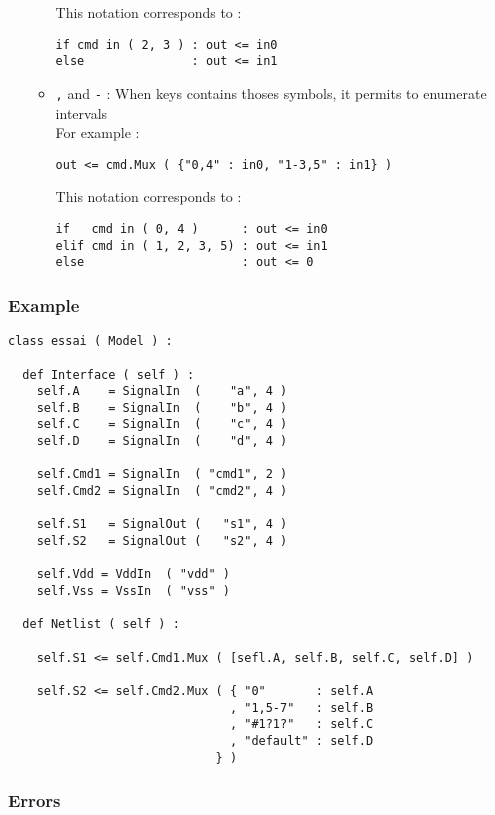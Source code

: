 \begin{itemize}
\begin{itemize}
\begin{verbatim}
        \end{verbatim}
        This notation corresponds to :
        \begin{verbatim}
if cmd in ( 2, 3 ) : out <= in0
else               : out <= in1
        \end{verbatim}
        \item \verb-,- and \verb"-" : When keys contains thoses symbols, it permits to enumerate intervals\\
        For example :
        \begin{verbatim}
out <= cmd.Mux ( {"0,4" : in0, "1-3,5" : in1} )
        \end{verbatim}
        This notation corresponds to :
        \begin{verbatim}
if   cmd in ( 0, 4 )      : out <= in0
elif cmd in ( 1, 2, 3, 5) : out <= in1
else                      : out <= 0
        \end{verbatim}
    \end{itemize}
\end{itemize}
          
\subsubsection{Example}

\begin{verbatim}
class essai ( Model ) :

  def Interface ( self ) :
    self.A    = SignalIn  (    "a", 4 )
    self.B    = SignalIn  (    "b", 4 )
    self.C    = SignalIn  (    "c", 4 )
    self.D    = SignalIn  (    "d", 4 )
    
    self.Cmd1 = SignalIn  ( "cmd1", 2 )
    self.Cmd2 = SignalIn  ( "cmd2", 4 )
    
    self.S1   = SignalOut (   "s1", 4 )
    self.S2   = SignalOut (   "s2", 4 )

    self.Vdd = VddIn  ( "vdd" )
    self.Vss = VssIn  ( "vss" )
	
  def Netlist ( self ) :

    self.S1 <= self.Cmd1.Mux ( [sefl.A, self.B, self.C, self.D] ) 

    self.S2 <= self.Cmd2.Mux ( { "0"       : self.A
                               , "1,5-7"   : self.B
                               , "#1?1?"   : self.C
                               , "default" : self.D
                             } )
\end{verbatim}
    
\subsubsection{Errors}
    
